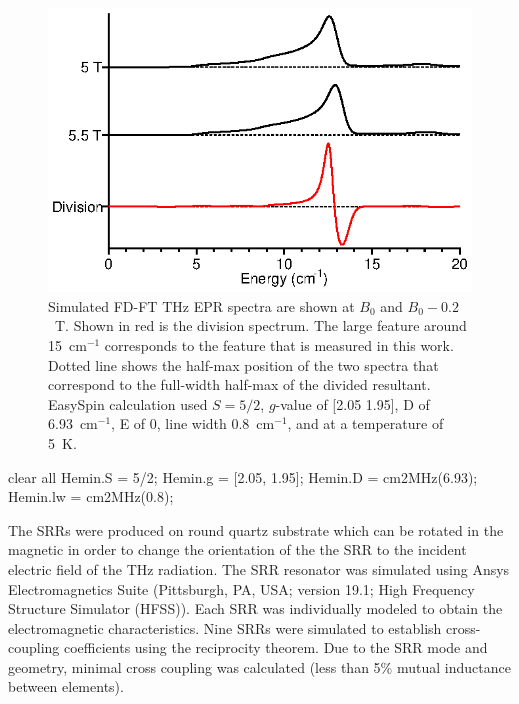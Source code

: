 \begin{figure}[htp]
\centering
  \includegraphics{Kapitel/Ch4-Images/Ch4-ExperimentExplain.eps}
  \caption[FD-FT THz EPR field division of spectra]{Simulated FD-FT THz EPR spectra are shown at $B_0$ and $B_0 - 0.2$~T. Shown in red is the division spectrum. The large feature around 15~cm$^{-1}$ corresponds to the feature that is measured in this work. Dotted line shows the half-max position of the two spectra that correspond to the full-width half-max of the divided resultant. EasySpin calculation used $S=5/2$, $g$-value of [2.05 1.95], D of 6.93~cm$^{-1}$, E of 0, line width 0.8~cm$^{-1}$, and at a temperature of 5~K.}
  \label{ch4-fig:FDS}
\end{figure}

clear all
Hemin.S = 5/2;
Hemin.g = [2.05, 1.95];
Hemin.D = cm2MHz(6.93);
Hemin.lw = cm2MHz(0.8);

The SRRs were produced on round quartz substrate which can be rotated in the magnetic in order to change the orientation of the the SRR to the incident electric field of the THz radiation. The SRR resonator was simulated using Ansys Electromagnetics Suite (Pittsburgh, PA, USA; version 19.1; High Frequency Structure Simulator (HFSS)). Each SRR was individually modeled to obtain the electromagnetic characteristics. Nine SRRs were simulated to establish cross-coupling coefficients using the reciprocity theorem. Due to the SRR mode and geometry, minimal cross coupling was calculated (less than 5\% mutual inductance between elements). 

